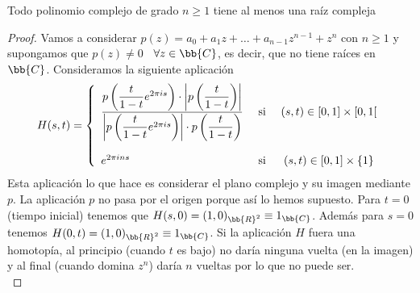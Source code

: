 \begin{teo}
    Todo polinomio complejo de grado $n \geq 1$ tiene al menos una raíz compleja
    \begin{proof}
        Vamos a considerar $p(z) = a_0+a_1z + \dots + a_{n-1}z^{n-1} + z^n$ con $n\geq 1$ y supongamos que $p(z)\neq 0$ \ $\forall z \in \bb{C}$, es decir, que no tiene raíces en $\bb{C}$. Consideramos la siguiente aplicación
        \begin{gather*}
            H(s,t) = \left\{
                \begin{array}{l c c}
                    \dfrac{p\left(\dfrac{t}{1-t} e^{2\pi i s}\right) \cdot \left|p\left(\dfrac{t}{1-t}\right)\right|}{\left|p\left(\dfrac{t}{1-t} e^{2\pi i s}\right)\right| \cdot p\left(\dfrac{t}{1-t}\right)} & \text{ si } & (s,t)\in [0,1]\times [0,1[\\\\
                    e^{2\pi i n s} & \text{ si } & (s,t)\in [0,1]\times\{1\}
                \end{array}
            \right.
        \end{gather*}
        Esta aplicación lo que hace es considerar el plano complejo y su imagen mediante $p$. La aplicación $p$ no pasa por el origen porque así lo hemos supuesto. Para $t=0$ (tiempo inicial) tenemos que $H(s,0) = (1,0)_{\bb{R}^2} \equiv 1_{\bb{C}}$. Además para $s=0$ tenemos $H(0,t) = (1,0)_{\bb{R}^2} \equiv 1_{\bb{C}}$. Si la aplicación $H$ fuera una homotopía, al principio (cuando $t$ es bajo) no daría ninguna vuelta (en la imagen) y al final (cuando domina $z^n$) daría $n$ vueltas por lo que no puede ser.\\


\end{proof}
\end{teo}
